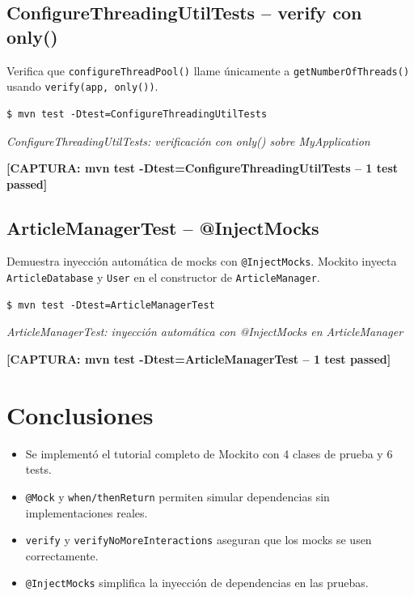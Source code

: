 \documentclass{article}
\begin{document}
\subsection{ConfigureThreadingUtilTests -- verify con only()}

Verifica que \texttt{configureThreadPool()} llame \'unicamente a \texttt{getNumberOfThreads()} usando \texttt{verify(app, only())}.

\begin{verbatim}
$ mvn test -Dtest=ConfigureThreadingUtilTests
\end{verbatim}

\begin{center}
    \textit{ConfigureThreadingUtilTests: verificaci\'on con only() sobre MyApplication}

    \textbf{[CAPTURA: mvn test -Dtest=ConfigureThreadingUtilTests -- 1 test passed]}
\end{center}

\subsection{ArticleManagerTest -- @InjectMocks}

Demuestra inyecci\'on autom\'atica de mocks con \texttt{@InjectMocks}. Mockito inyecta \texttt{ArticleDatabase} y \texttt{User} en el constructor de \texttt{ArticleManager}.

\begin{verbatim}
$ mvn test -Dtest=ArticleManagerTest
\end{verbatim}

\begin{center}
    \textit{ArticleManagerTest: inyecci\'on autom\'atica con @InjectMocks en ArticleManager}

    \textbf{[CAPTURA: mvn test -Dtest=ArticleManagerTest -- 1 test passed]}
\end{center}

\section{Conclusiones}
\begin{itemize}
    \item Se implement\'o el tutorial completo de Mockito con 4 clases de prueba y 6 tests.
    \item \texttt{@Mock} y \texttt{when/thenReturn} permiten simular dependencias sin implementaciones reales.
    \item \texttt{verify} y \texttt{verifyNoMoreInteractions} aseguran que los mocks se usen correctamente.
    \item \texttt{@InjectMocks} simplifica la inyecci\'on de dependencias en las pruebas.
\end{itemize}
\end{document}
